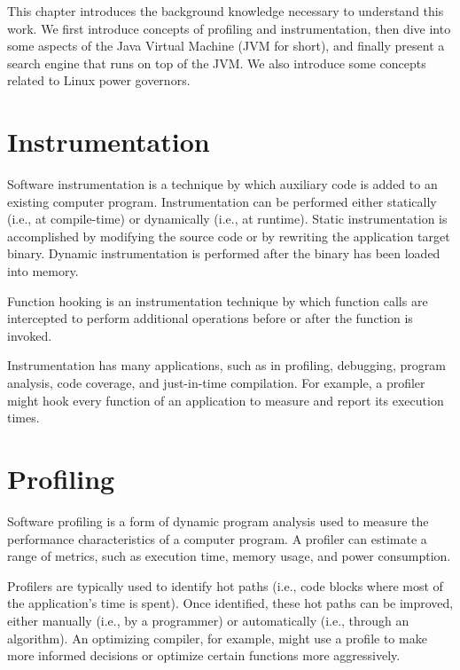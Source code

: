 \label{cap:background}

This chapter introduces the background knowledge necessary to understand this work. We first introduce concepts of profiling and instrumentation, then dive into some aspects of the Java Virtual Machine (JVM for short), and finally present a search engine that runs on top of the JVM. We also introduce some concepts related to Linux power governors.

\section{Instrumentation}

Software instrumentation is a technique by which auxiliary code is added to an existing computer program. Instrumentation can be performed either statically (i.e., at compile-time) or dynamically (i.e., at runtime). Static instrumentation is accomplished by modifying the source code or by rewriting the application target binary. Dynamic instrumentation is performed after the binary has been loaded into memory.

Function hooking is an instrumentation technique by which function calls are intercepted to perform additional operations before or after the function is invoked.

Instrumentation has many applications, such as in profiling, debugging, program analysis, code coverage, and just-in-time compilation. For example, a profiler might hook every function of an application to measure and report its execution times.



\section{Profiling}

Software profiling is a form of dynamic program analysis used to measure the performance characteristics of a computer program. A profiler can estimate a range of metrics, such as execution time, memory usage, and power consumption.

Profilers are typically used to identify hot paths (i.e., code blocks where most of the application's time is spent). Once identified, these hot paths can be improved, either manually (i.e., by a programmer) or automatically (i.e., through an algorithm). An optimizing compiler, for example, might use a profile to make more informed decisions or optimize certain functions more aggressively.

